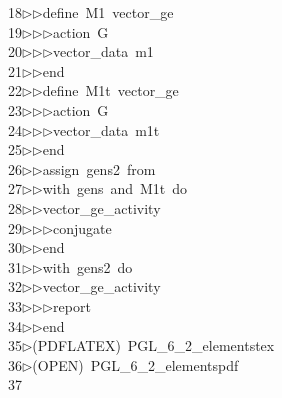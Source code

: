\begin{tabbing}
18\>$\triangleright$\>$\triangleright$\>define\ M1\ vector\_ge\ \\[0pt]
19\>$\triangleright$\>$\triangleright$\>$\triangleright$\>action\ G\ \\[0pt]
20\>$\triangleright$\>$\triangleright$\>$\triangleright$\>vector\_data\ m1\ \\[0pt]
21\>$\triangleright$\>$\triangleright$\>end\ \\[0pt]
22\>$\triangleright$\>$\triangleright$\>define\ M1t\ vector\_ge\ \\[0pt]
23\>$\triangleright$\>$\triangleright$\>$\triangleright$\>action\ G\ \\[0pt]
24\>$\triangleright$\>$\triangleright$\>$\triangleright$\>vector\_data\ m1t\ \\[0pt]
25\>$\triangleright$\>$\triangleright$\>end\ \\[0pt]
26\>$\triangleright$\>$\triangleright$\>assign\ gens2\ from\ \\[0pt]
27\>$\triangleright$\>$\triangleright$\>with\ gens\ and\ M1t\ do\ \\[0pt]
28\>$\triangleright$\>$\triangleright$\>vector\_ge\_activity\ \\[0pt]
29\>$\triangleright$\>$\triangleright$\>$\triangleright$\>conjugate\ \\[0pt]
30\>$\triangleright$\>$\triangleright$\>end\ \\[0pt]
31\>$\triangleright$\>$\triangleright$\>with\ gens2\ do\ \\[0pt]
32\>$\triangleright$\>$\triangleright$\>vector\_ge\_activity\ \\[0pt]
33\>$\triangleright$\>$\triangleright$\>$\triangleright$\>report\ \\[0pt]
34\>$\triangleright$\>$\triangleright$\>end\\[0pt]
35\>$\triangleright$\>(PDFLATEX)\ PGL\_6\_2\_elementstex\\[0pt]
36\>$\triangleright$\>(OPEN)\ PGL\_6\_2\_elementspdf\\[0pt]
37\>\end{tabbing}
